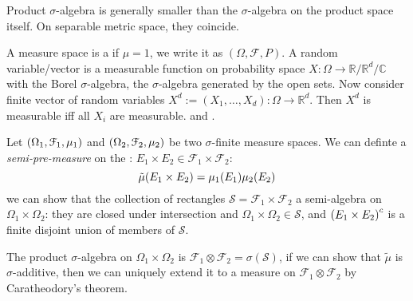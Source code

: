 \begin{proposition}
    Product \(\sigma\)-algebra is generally smaller than the \(\sigma\)-algebra on the product space itself. On separable metric space, they coincide. 
\end{proposition}

A measure space is a  if \(\mu =1\), we write it as \((\Omega, \mathcal{F}, P)\). A random variable/vector is a measurable function on probability space \(X: \Omega \to \mathbb{R}/\mathbb{R}^{d}/\mathbb{C}\) with the Borel \(\sigma\)-algebra, the \(\sigma\)-algebra generated by the open sets.
{}
Now consider finite vector of random variables \(X^{d} := (X_{1}, \dots,X_{d}) : \Omega \to \mathbb{R}^{d}\). Then \(X^{d}\) is measurable iff all \(X_{i}\) are measurable. 
 and . 


Let \(\pqty{\Omega_{1}, \mathcal{F}_{1}, \mu_{1}}\) and \(\pqty{\Omega_{2}, \mathcal{F}_{2} , \mu_{2}}\) be two \(\sigma\)-finite measure spaces. We can definte a \textit{semi-pre-measure} on the : \(E_{1}\times E_{2} \in \mathcal{F}_{1} \times \mathcal{F}_{2}\):
\begin{equation*}
    \tilde{\mu} \pqty{E_{1} \times E_{2}} = \mu_{1} \pqty{E_{1}} \mu_{2} \pqty{E_{2}}
\end{equation*}
we can show that the collection of rectangles \(\mathcal{S} = \mathcal{F}_{1}\times \mathcal{F}_{2}\) a semi-algebra  on \(\Omega_{1}\times \Omega_{2}\): they are closed under intersection and \(\Omega_{1} \times \Omega_{2} \in \mathcal{S}\), and \(\pqty{E_{1}\times E_{2}}^{c}\) is a finite disjoint union of members of \(\mathcal{S}\). 

The product \(\sigma\)-algebra on \(\Omega_{1}\times \Omega_{2}\) is \(\mathcal{F}_{1} \otimes \mathcal{F}_{2} = \sigma(\mathcal{S})\), if we can show that \(\tilde{\mu}\) is \(\sigma\)-additive, then we can uniquely extend it to a measure on \(\mathcal{F}_{1} \otimes \mathcal{F}_{2}\) by Caratheodory's theorem. 

